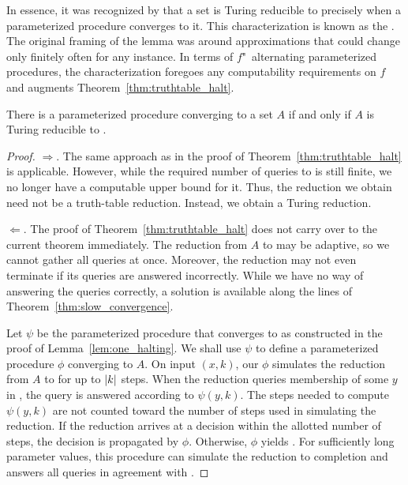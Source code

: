 In essence, it was recognized by \textcite{shoenfield1959degrees} that a set is Turing reducible to  precisely when a parameterized procedure converges to it.
This characterization is known as the  \parencite{odifreddi1992classical,downey2010algorithmic}.
The original framing of the lemma was around approximations that could change only finitely often for any instance.
In terms of $f$"~alternating parameterized procedures, the characterization foregoes any computability requirements on $f$ and augments Theorem~\ref{thm:truthtable_halt}.
\begin{theorem}
\label{thm:turing_halt}%
  There is a parameterized procedure converging to a set $A$ if and only if $A$ is Turing reducible to .
\end{theorem}
\begin{proof}
  $\Longrightarrow$.
  The same approach as in the proof of Theorem~\ref{thm:truthtable_halt} is applicable.
  However, while the required number of queries to  is still finite, we no longer have a computable upper bound for it.
  Thus, the reduction we obtain need not be a truth-table reduction.
  Instead, we obtain a Turing reduction.

  $\Longleftarrow$.
  The proof of Theorem~\ref{thm:truthtable_halt} does not carry over to the current theorem immediately.
  The reduction from $A$ to  may be adaptive, so we cannot gather all queries at once.
  Moreover, the reduction may not even terminate if its queries are answered incorrectly.
  While we have no way of answering the queries correctly, a solution is available along the lines of Theorem~\ref{thm:slow_convergence}.

  Let $\psi$ be the parameterized procedure that converges to  as constructed in the proof of Lemma~\ref{lem:one_halting}.
  We shall use $\psi$ to define a parameterized procedure $\phi$ converging to $A$.
  On input $(x, k)$, our $\phi$ simulates the reduction from $A$ to  for up to ${\lvert k\rvert}$ steps.
  When the reduction queries membership of some $y$ in , the query is answered according to $\psi(y, k)$.
  The steps needed to compute $\psi(y, k)$ are not counted toward the number of steps used in simulating the reduction.
  If the reduction arrives at a decision within the allotted number of steps, the decision is propagated by $\phi$.
  Otherwise, $\phi$ yields .
  For sufficiently long parameter values, this procedure can simulate the reduction to completion and answers all queries in agreement with .
\end{proof}

